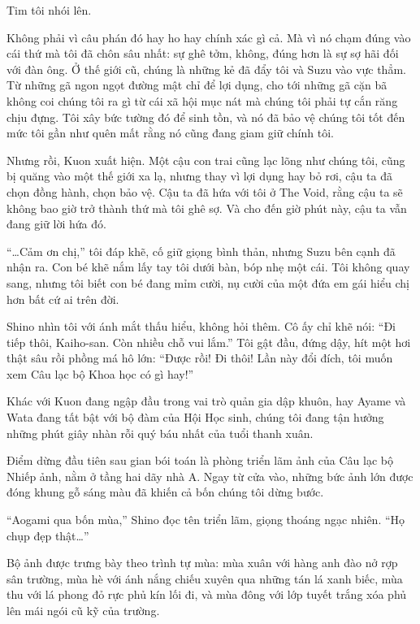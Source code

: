 \documentclass[../main.tex]{subfiles}
\begin{document}
Tim tôi nhói lên.

Không phải vì câu phán đó hay ho hay chính xác gì cả. Mà vì nó chạm đúng vào cái thứ mà tôi đã chôn sâu nhất: sự ghê tởm, không, đúng hơn là sự sợ hãi đối với đàn ông. Ở thế giới cũ, chúng là những kẻ đã đẩy tôi và Suzu vào vực thẳm. Từ những gã ngon ngọt đường mật chỉ để lợi dụng, cho tới những gã cặn bã không coi chúng tôi ra gì từ cái xã hội mục nát mà chúng tôi phải tự cắn răng chịu đựng. Tôi xây bức tường đó để sinh tồn, và nó đã bảo vệ chúng tôi tốt đến mức tôi gần như quên mất rằng nó cũng đang giam giữ chính tôi.

Nhưng rồi, Kuon xuất hiện. Một cậu con trai cũng lạc lõng như chúng tôi, cũng bị quăng vào một thế giới xa lạ, nhưng thay vì lợi dụng hay bỏ rơi, cậu ta đã chọn đồng hành, chọn bảo vệ. Cậu ta đã hứa với tôi ở The Void, rằng cậu ta sẽ không bao giờ trở thành thứ mà tôi ghê sợ. Và cho đến giờ phút này, cậu ta vẫn đang giữ lời hứa đó.

``\dots Cảm ơn chị,'' tôi đáp khẽ, cố giữ giọng bình thản, nhưng Suzu bên cạnh đã nhận ra. Con bé khẽ nắm lấy tay tôi dưới bàn, bóp nhẹ một cái. Tôi không quay sang, nhưng tôi biết con bé đang mỉm cười, nụ cười của một đứa em gái hiểu chị hơn bất cứ ai trên đời.

Shino nhìn tôi với ánh mắt thấu hiểu, không hỏi thêm. Cô ấy chỉ khẽ nói: ``Đi tiếp thôi, Kaiho-san. Còn nhiều chỗ vui lắm.'' Tôi gật đầu, đứng dậy, hít một hơi thật sâu rồi phồng má hô lớn: ``Được rồi! Đi thôi! Lần này đổi đích, tôi muốn xem Câu lạc bộ Khoa học có gì hay!''

\ct

Khác với Kuon đang ngập đầu trong vai trò quản gia dập khuôn, hay Ayame và Wata đang tất bật với bộ đàm của Hội Học sinh, chúng tôi đang tận hưởng những phút giây nhàn rỗi quý báu nhất của tuổi thanh xuân.

Điểm dừng đầu tiên sau gian bói toán là phòng triển lãm ảnh của Câu lạc bộ Nhiếp ảnh, nằm ở tầng hai dãy nhà A. Ngay từ cửa vào, những bức ảnh lớn được đóng khung gỗ sáng màu đã khiến cả bốn chúng tôi dừng bước.

``Aogami qua bốn mùa,'' Shino đọc tên triển lãm, giọng thoáng ngạc nhiên. ``Họ chụp đẹp thật\dots''

Bộ ảnh được trưng bày theo trình tự mùa: mùa xuân với hàng anh đào nở rợp sân trường, mùa hè với ánh nắng chiếu xuyên qua những tán lá xanh biếc, mùa thu với lá phong đỏ rực phủ kín lối đi, và mùa đông với lớp tuyết trắng xóa phủ lên mái ngói cũ kỹ của trường.
\end{document}
